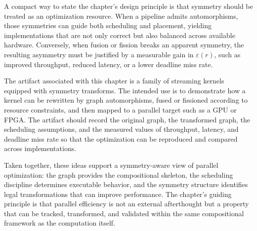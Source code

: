 \documentclass[11pt]{article}
\begin{document}
A compact way to state the chapter's design principle is that symmetry should be treated as an optimization resource. When a pipeline admits automorphisms, those symmetries can guide both scheduling and placement, yielding implementations that are not only correct but also balanced across available hardware. Conversely, when fusion or fission breaks an apparent symmetry, the resulting asymmetry must be justified by a measurable gain in \(\varepsilon(r)\), such as improved throughput, reduced latency, or a lower deadline miss rate.

The artifact associated with this chapter is a family of streaming kernels equipped with symmetry transforms. The intended use is to demonstrate how a kernel can be rewritten by graph automorphisms, fused or fissioned according to resource constraints, and then mapped to a parallel target such as a GPU or FPGA. The artifact should record the original graph, the transformed graph, the scheduling assumptions, and the measured values of throughput, latency, and deadline miss rate so that the optimization can be reproduced and compared across implementations.

Taken together, these ideas support a symmetry-aware view of parallel optimization: the graph provides the compositional skeleton, the scheduling discipline determines executable behavior, and the symmetry structure identifies legal transformations that can improve performance. The chapter's guiding principle is that parallel efficiency is not an external afterthought but a property that can be tracked, transformed, and validated within the same compositional framework as the computation itself.
\end{document}
